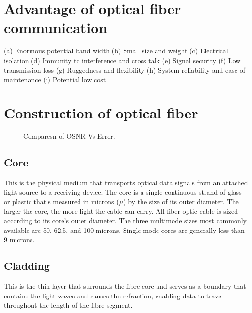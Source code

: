 \documentclass[12pt]{report}
\begin{document}
	\section{Advantage of optical fiber communication }
	(a) Enormous potential band width (b) Small size and weight (c) Electrical isolation (d) Immunity to interference and cross talk (e) Signal security (f) Low transmission loss (g) Ruggedness and flexibility (h) System reliability and ease of maintenance (i)  Potential low cost 
	\section{Construction of optical fiber}
	\begin{figure}[htbp]
		\caption{Comparesn of OSNR Vs Error.}
		\label{fig1}
	\end{figure}
	\subsection*{Core}
	This is the physical medium that transports optical data signals from an attached light source to a receiving device. The core is a single continuous strand of glass or plastic that’s measured in microns ($\mu$) by the size of its outer diameter. The larger the core, the more light the cable can carry. All fiber optic cable is sized according to its core’s outer diameter. The three multimode sizes most commonly available are 50, 62.5, and 100 microns. Single-mode cores are generally less than 9 microns.
	\subsection*{Cladding}
	This is the thin layer that surrounds the fibre core and serves as a boundary that contains the light waves and causes the refraction, enabling data to travel throughout the length of the fibre segment. 
\end{document}
